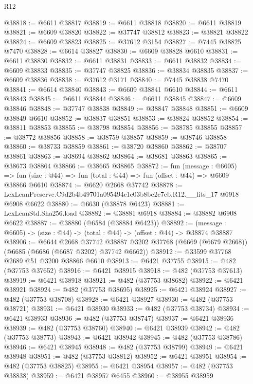 \begin{lexlean}{R12}
\begin{coremodule}
@38818 := @6611 @38817
@38819 := @6611 @38818
@38820 := @6611 @38819
@38821 := @6609 @38820
@38822 := @37747 @38812
@38823 := @38821 @38822
@38824 := @6609 @38823
@38825 := @37612 @3154
@38827 := @7445 @38825 @7470
@38828 := @6614 @38827
@38830 := @6609 @38828 @6610
@38831 := @6611 @38830
@38832 := @6611 @38831
@38833 := @6611 @38832
@38834 := @6609 @38833
@38835 := @37747 @38825
@38836 := @38834 @38835
@38837 := @6609 @38836
@38838 := @37612 @3171
@38840 := @7445 @38838 @7470
@38841 := @6614 @38840
@38843 := @6609 @38841 @6610
@38844 := @6611 @38843
@38845 := @6611 @38844
@38846 := @6611 @38845
@38847 := @6609 @38846
@38848 := @37747 @38838
@38849 := @38847 @38848
@38851 := @6609 @38849 @6610
@38852 := @38837 @38851
@38853 := @38824 @38852
@38854 := @38811 @38853
@38855 := @38798 @38854
@38856 := @38785 @38855
@38857 := @38772 @38856
@38858 := @38759 @38857
@38859 := @38746 @38858
@38860 := @38733 @38859
@38861 := @38720 @38860
@38862 := @38707 @38861
@38863 := @38694 @38862
@38864 := @38681 @38863
@38865 := @38673 @38864
@38866 := @38665 @38865
@38872 := fun (message : @6605) =>
  fun (size : @44) => fun (total : @44) => fun (offset : @44) => @6609 @38866 @6610
@38874 := @6620 @2668 @37742
@38878 := LexLeanPreserve.C9d2b4b49701a095494c1c03b8be2e7cb.R12.__fits_17 @6918 @6908 @6622
@38880 := @6630 (@38878 @6423)
@38881 := LexLeanStd.Sha256.load
@38882 := @38881 @6918
@38884 := @38882 @6908 @6622
@38887 := @38880 (@6584 (@38884 @6423))
@38892 := (message : @6605) -> (size : @44) -> (total : @44) -> (offset : @44) -> @38874 @38887
@38906 := @6644
    @2668
    @37742
    @38887
    @3202
    @37768
    (@6669 (@6679 @2668))
    (@6685 (@6686 (@6687 @3202) @37742 @6662))
@38912 := @33599 @37768 @2689 @51 @3200 @38866 @6610
@38913 := @6421 @37755
@38915 := @482 (@37753 @37652)
@38916 := @6421 @38915
@38918 := @482 (@37753 @37613)
@38919 := @6421 @38918
@38921 := @482 (@37753 @38682)
@38922 := @6421 @38921
@38924 := @482 (@37753 @38695)
@38925 := @6421 @38924
@38927 := @482 (@37753 @38708)
@38928 := @6421 @38927
@38930 := @482 (@37753 @38721)
@38931 := @6421 @38930
@38933 := @482 (@37753 @38734)
@38934 := @6421 @38933
@38936 := @482 (@37753 @38747)
@38937 := @6421 @38936
@38939 := @482 (@37753 @38760)
@38940 := @6421 @38939
@38942 := @482 (@37753 @38773)
@38943 := @6421 @38942
@38945 := @482 (@37753 @38786)
@38946 := @6421 @38945
@38948 := @482 (@37753 @38799)
@38949 := @6421 @38948
@38951 := @482 (@37753 @38812)
@38952 := @6421 @38951
@38954 := @482 (@37753 @38825)
@38955 := @6421 @38954
@38957 := @482 (@37753 @38838)
@38959 := @6421 @38957 @6455
@38960 := @38955 @38959

\end{coremodule}
\end{lexlean}
